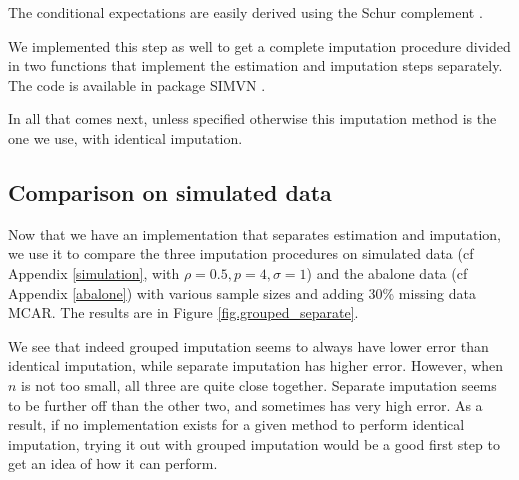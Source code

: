 The conditional expectations are easily derived using the Schur complement \cite{norm_schur}.

We implemented this step as well to get a complete imputation procedure divided in two functions that implement the estimation and imputation steps separately. The code is available in package SIMVN \cite{SIMVN_github}.

In all that comes next, unless specified otherwise this imputation method is the one we use, with identical imputation.

		\subsection{Comparison on simulated data}
Now that we have an implementation that separates estimation and imputation, we use it to compare the three imputation procedures on simulated data (cf Appendix \ref{simulation}, with $\rho=0.5, p=4, \sigma=1$) and the abalone data (cf Appendix \ref{abalone}) with various sample sizes and adding 30\% missing data MCAR. The results are in Figure \ref{fig.grouped_separate}.


	
We see that indeed grouped imputation seems to always have lower error than identical imputation, while separate imputation has higher error. However, when $n$ is not too small, all three are quite close together. Separate imputation seems to be further off than the other two, and sometimes has very high error. As a result, if no implementation exists for a given method to perform identical imputation, trying it out with grouped imputation would be a good first step to get an idea of how it can perform.